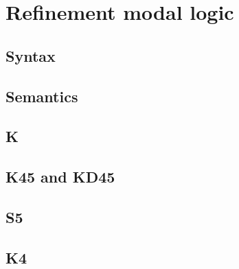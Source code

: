 \chapter{Refinement modal logic}

\section{Syntax}

\section{Semantics}

\section{K}

\section{K45 and KD45}

\section{S5}

\section{K4}
